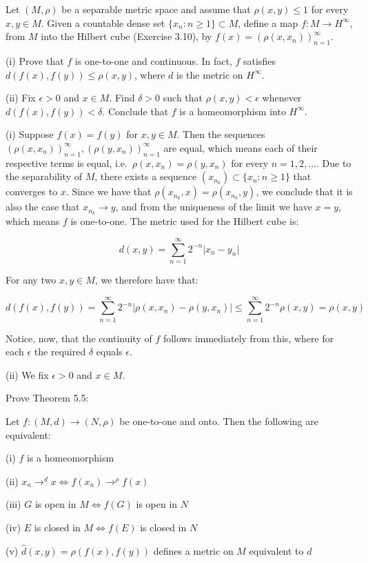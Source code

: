 \begin{exercise}{51}
    Let $(M, \rho)$ be a separable metric space and assume that $\rho(x, y) \leq 1$ for every $x, y \in M$.
    Given a countable dense set $\{x_n: n \geq 1\} \subset M$, define a map $f: M \rightarrow H^{\infty}$, from $M$ into the Hilbert cube (Exercise 3.10), by $f(x) = (\rho(x, x_n))_{n=1}^{\infty}$.

    (i) Prove that $f$ is one-to-one and continuous.
    In fact, $f$ satisfies $d(f(x), f(y)) \leq \rho(x, y)$, where $d$ is the metric on $H^{\infty}$.

    (ii) Fix $\epsilon > 0$ and $x \in M$.
    Find $\delta > 0$ such that $\rho(x, y) < \epsilon$ whenever $d(f(x), f(y)) < \delta$.
    Conclude that $f$ is a homeomorphism into $H^{\infty}$.
\end{exercise}

\begin{solution}
    
    (i) Suppose $f(x) = f(y)$ for $x, y \in M$.
    Then the sequences $(\rho(x, x_n))_{n=1}^{\infty}, (\rho(y, x_n))_{n=1}^{\infty}$ are equal, which means each of their respective terms is equal, i.e.\ $\rho(x, x_n) = \rho(y, x_n)$ for every $n = 1, 2, \ldots$.
    Due to the separability of $M$, there exists a sequence $(x_{n_k}) \subset \{x_n: n \geq 1\}$ that converges to $x$.
    Since we have that $\rho(x_{n_k}, x) = \rho(x_{n_k}, y)$, we conclude that it is also the case that $x_{n_k} \rightarrow y$, and from the uniqueness of the limit we have $x = y$, which means $f$ is one-to-one.
    The metric used for the Hilbert cube is:

    \[d(x, y) = \sum_{n=1}^{\infty}2^{-n} \lvert x_n - y_n \rvert\]

    For any two $x, y \in M$, we therefore have that:

    \[d(f(x), f(y)) = \sum_{n=1}^{\infty} 2^{-n} \lvert \rho(x, x_n) - \rho(y, x_n) \rvert \leq \sum_{n=1}^{\infty} 2^{-n} \rho(x, y) = \rho(x, y)\]

    Notice, now, that the continuity of $f$ follows immediately from this, where for each $\epsilon$ the required $\delta$ equals $\epsilon$.

    (ii) We fix $\epsilon > 0$ and $x \in M$.
    

\end{solution}

\begin{exercise}{52}
    Prove Theorem 5.5:

    Let $f: (M, d) \rightarrow (N, \rho)$ be one-to-one and onto.
    Then the following are equivalent:

    (i) $f$ is a homeomorphism

    (ii) $x_n \rightarrow^{d} x \iff f(x_n) \rightarrow^{\rho} f(x)$ 

    (iii) $G$ is open in $M \iff f(G)$  is open in $N$

    (iv) $E$ is closed in $M \iff f(E)$ is closed in $N$

    (v) $\hat{d}(x, y) = \rho(f(x), f(y))$ defines a metric on $M$ equivalent to $d$
\end{exercise}

